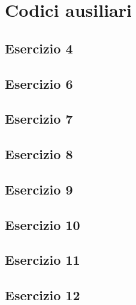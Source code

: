 \section{Codici ausiliari}

\subsection{Esercizio 4}


\subsection{Esercizio 6}


\subsection{Esercizio 7}


\subsection{Esercizio 8}


\subsection{Esercizio 9}


\subsection{Esercizio 10}


\subsection{Esercizio 11}


\subsection{Esercizio 12}


